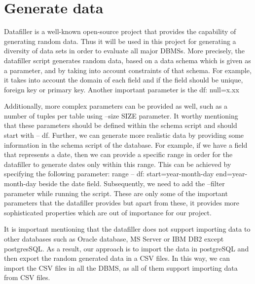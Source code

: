 \section{Generate data}
Datafiller is a well-known open-source project that provides the capability of generating random data. Thus it will be used in this project for generating a diversity of  data sets in order to evaluate all major DBMSs. More precisely, the datafiller script generates random data, based on a data schema which is given as a parameter, and by taking into account constraints of that schema. For example, it takes into account the domain of each field and if the field should be unique, foreign key or primary key. Another important parameter is the df: null=x.xx%

Additionally, more complex parameters can be provided as well, such as a number of tuples per table using --size SIZE parameter. It worthy mentioning that these parameters should be defined within the schema script and should start with -- df.  Further, we can generate more realistic data by providing some information in the schema script of the database. For example, if we have a field that represents a date, then we can provide a specific range in order for the datafiller to generate dates only within this range. This can be achieved by specifying the following parameter: range -- df: start=year-month-day end=year-month-day beside the date field. Subsequently, we need to add the --filter parameter while running the script. These are only some of the important parameters that the datafiller provides but apart from these, it provides more sophisticated properties which are out of importance for our project.

It is important mentioning that the datafiller does not support importing data to other databases such as Oracle database, MS Server or IBM DB2 except postgresSQL. As a result, our approach is to import the data in postgreSQL and then export the random generated data in a CSV files. In this way, we can import the CSV files in all the DBMS, as all of them support importing data from CSV files.  

